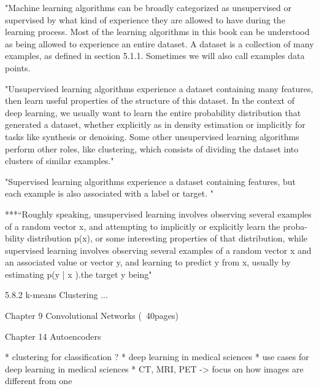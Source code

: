 "Machine learning algorithms can be broadly categorized as unsupervised or supervised by what kind of experience they are allowed to have during the learning process. Most of the learning algorithms in this book can be understood as being allowed to experience an entire dataset. A dataset is a collection of many examples, as defined in section 5.1.1. Sometimes we will also call examples data points.

"Unsupervised learning algorithms experience a dataset containing many features, then learn useful properties of the structure of this dataset. In the context of deep learning, we usually want to learn the entire probability distribution that generated a dataset, whether explicitly as in density estimation or implicitly for tasks like synthesis or denoising. Some other unsupervised learning algorithms perform other roles, like clustering, which consists of dividing the dataset into clusters of similar examples."

"Supervised learning algorithms experience a dataset containing features, but each example is also associated with a label or target. "

***``Roughly speaking, unsupervised learning involves observing several examples of a random vector x, and attempting to implicitly or explicitly learn the proba- bility distribution p(x), or some interesting properties of that distribution, while supervised learning involves observing several examples of a random vector x and an associated value or vector y, and learning to predict y from x, usually by estimating p(y | x ).the target y being"

5.8.2
k-means Clustering
...

Chapter 9
Convolutional Networks (~40pages)

Chapter 14
Autoencoders


* clustering for classification 
?
* deep learning in medical sciences
* use cases for deep learning in medical sciences
* CT, MRI, PET -> focus on how images are different from one

